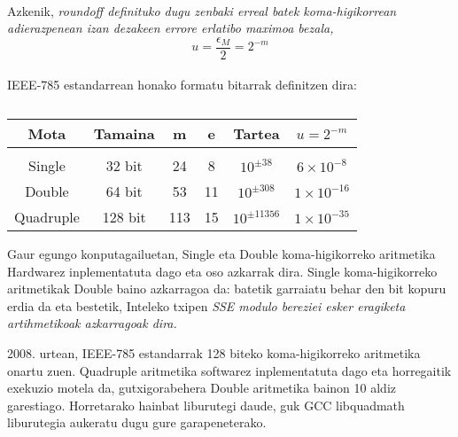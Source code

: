 \paragraph*{}
Azkenik, \it{roundoff} definituko dugu zenbaki erreal batek koma-higikorrean adierazpenean izan dezakeen errore erlatibo maximoa bezala,
\begin{equation*}
u=\frac{\epsilon_M}{2}=2^{-m}
\end{equation*}  


\paragraph*{}IEEE-785 estandarrean honako formatu bitarrak definitzen dira:

\begin{table} [h!]
\caption{}
\label{tab:1}       %
\begin{tabular}{ |c|c|c|c|c|c|} 
\hline
 Mota      &  Tamaina    & m   & e  & Tartea           &  $u=2^{-m}$           \\ \hline
           &             &     &    &                  &                       \\
 Single    & 32 bit      & 24  & 8  & $10^{\pm 38}$    &  $6 \times 10^{-8}$   \\	    
 Double    & 64 bit      & 53  & 11 & $10^{\pm 308}$   &  $1 \times 10^{-16}$   \\
 Quadruple & 128 bit     & 113 & 15 & $10^{\pm 11356}$ &  $1 \times 10^{-35}$   \\
\hline
\end{tabular}
\end{table}

Gaur egungo konputagailuetan, Single eta Double koma-higikorreko aritmetika Hardwarez inplementatuta dago eta oso azkarrak dira. Single koma-higikorreko aritmetikak Double baino azkarragoa da: batetik garraiatu behar den bit kopuru erdia da eta bestetik, Inteleko txipen \it SSE modulo bereziei esker eragiketa artihmetikoak azkarragoak dira.

2008. urtean, IEEE-785 estandarrak 128 biteko koma-higikorreko aritmetika onartu zuen. Quadruple aritmetika softwarez inplementatuta dago eta horregaitik exekuzio motela da, gutxigorabehera Double aritmetika bainon 10 aldiz garestiago. Horretarako hainbat liburutegi daude, guk GCC libquadmath liburutegia aukeratu dugu gure garapeneterako.

